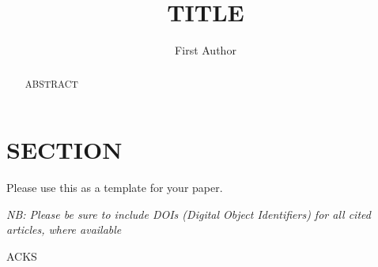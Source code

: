 \documentclass{jot}
\title{TITLE}
\author[affiliation=orgname, nowrap] %
    {First Author}
    {is ...
    Contact him at \email{EMAIL}, or visit \url{URL}.}
\affiliation{orgname}{ORGANISATION}
\begin{document}
\begin{abstract}
ABSTRACT
\end{abstract}


\section{SECTION}

Please use this as a template for your paper.

\backmatter

\emph{NB: Please be sure to include DOIs (Digital Object Identifiers) for all cited articles, where available}




\abouttheauthors

\begin{acknowledgments}
ACKS
\end{acknowledgments}
\end{document}

